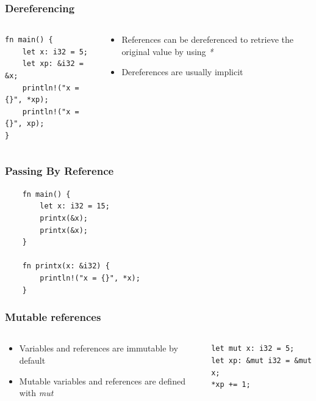 \documentclass{beamer}
\begin{document}
\begin{frame}[fragile]
    \frametitle{Dereferencing}
    \begin{columns}
        \begin{column}{0.5\textwidth}
        \begin{verbatim}
fn main() {
    let x: i32 = 5;
    let xp: &i32 = &x;
    println!("x = {}", *xp);
    println!("x = {}", xp);
}
        \end{verbatim}
        \end{column}
        \begin{column}{0.5\textwidth}
            \begin{itemize}
                    \item References can be dereferenced to retrieve the original value by using \textit{*}
                    \item Dereferences are usually implicit
            \end{itemize}

        \end{column}
    \end{columns}
\end{frame}
\begin{frame}[fragile]
    \frametitle{Passing By Reference}
    \begin{verbatim}
    fn main() {
        let x: i32 = 15;
        printx(&x);
        printx(&x);
    }

    fn printx(x: &i32) {
        println!("x = {}", *x);
    }
    \end{verbatim}
\end{frame}
\begin{frame}[fragile]
    \frametitle{Mutable references}
    \begin{columns}
        \begin{column}{0.5\textwidth}
            \begin{itemize}
                \item Variables and references are immutable by default
                \item Mutable variables and references are defined with \textit{mut}
            \end{itemize}
        \end{column}
        \begin{column}{0.5\textwidth}
            \begin{verbatim}
let mut x: i32 = 5;
let xp: &mut i32 = &mut x;
*xp += 1;
            \end{verbatim}
        \end{column}
    \end{columns}
\end{frame}
\end{document}
